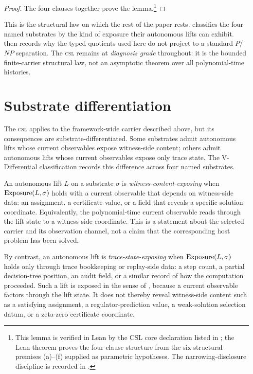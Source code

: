 \documentclass[11pt]{article}
\newcommand{\CSL}{\textsc{csl}}            \newcommand{\CSLcore}{Candidate Structural Law}
\newcommand{\Substrate}{\sigma}             \newcommand{\Lift}{L}                       \newcommand{\LiftState}{\sigma_{L}}         \newcommand{\HistorySpace}{H_{\Substrate}^{\Lift}}
\newcommand{\DiagnosisGrade}{\emph{diagnosis grade}}
\theoremstyle{definition}
\begin{document}
\begin{proof}
The four clauses together prove the lemma.\footnote{This lemma is
verified in Lean by the CSL core declaration listed in
; the Lean theorem proves the four-clause
structure from the six structural premises (a)--(f) supplied as
parametric hypotheses.  The narrowing-disclosure discipline is recorded
in .}
\end{proof}

This is the structural law on which the rest of the paper rests.
 classifies the four named substrates by the
kind of exposure their autonomous lifts can exhibit.
 then records why the typed quotients
used here do not project to a standard \(P\)/\(NP\) separation.  The
\CSL{} remains at \DiagnosisGrade{} throughout: it is the bounded
finite-carrier structural law, not an asymptotic theorem over all
polynomial-time histories.
 

\section{Substrate differentiation}
\label{sec:v-differential}

The \CSL{} applies to the framework-wide carrier described above, but
its consequences are substrate-differentiated.  Some substrates admit
autonomous lifts whose current observables expose witness-side content;
others admit autonomous lifts whose current observables expose only
trace state.  The V-Differential classification records this difference
across four named substrates.

An autonomous lift \(\Lift\) on a substrate \(\Substrate\) is
\emph{witness-content-exposing} when
\(\Exposure(\Lift,\Substrate)\) holds with a current observable that
depends on witness-side data: an assignment, a certificate value, or a
field that reveals a specific solution coordinate.  Equivalently, the
polynomial-time current observable reads through the lift state to a
witness-side coordinate.  This is a statement about the selected
carrier and its observation channel, not a claim that the corresponding
host problem has been solved.

By contrast, an autonomous lift is \emph{trace-state-exposing} when
\(\Exposure(\Lift,\Substrate)\) holds only through trace bookkeeping or
replay-side data: a step count, a partial decision-tree position, an
audit field, or a similar record of how the computation proceeded.
Such a lift is exposed in the sense of ,
because a current observable factors through the lift state.  It does
not thereby reveal witness-side content such as a satisfying assignment,
a regulator-prediction value, a weak-solution selection datum, or a
zeta-zero certificate coordinate.
\end{document}
